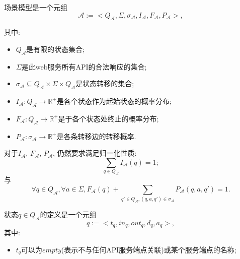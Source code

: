         \begin{definition}
            \label{def:our}
            场景模型是一个元组
            \begin{equation}
                \label{eq:scenario_model}
                 \mathcal{A} := <Q_{\mathcal{A}}, \Sigma, \sigma_{\mathcal{A}}, I_{\mathcal{A}}, F_{\mathcal{A}}, P_{\mathcal{A}}>,
            \end{equation}
            
            其中:
            \begin{itemize}
                \item $Q_{\mathcal{A}}$是有限的状态集合;
                
                \item $\Sigma$是此web服务所有API的合法响应的集合;
                
                \item $\sigma_{\mathcal{A}} \subseteq Q_{\mathcal{A}} \times \Sigma \times Q_{\mathcal{A}}$是状态转移的集合;
                
                \item $I_{\mathcal{A}} : Q_{\mathcal{A}} \to \mathbb{R}^{+}$是各个状态作为起始状态的概率分布;
                
                \item $F_{\mathcal{A}} : Q_{\mathcal{A}} \to \mathbb{R}^{+}$是于各个状态处终止的概率分布;
                
                \item $P_{\mathcal{A}}: \sigma_{\mathcal{A}} \to \mathbb{R}^{+}$是各条转移边的转移概率.
            \end{itemize}
            
            对于$I_{\mathcal{A}}$, $F_{\mathcal{A}}$, $P_{\mathcal{A}}$, 仍然要求满足归一化性质:
            \begin{equation}
                \label{eq:model_normal1}
                \sum_{q \in Q_{\mathcal{A}}} I_{\mathcal{A}}(q) = 1;
            \end{equation}
            与
            \begin{equation}
                \label{eq:model_normal2}
                \forall q \in Q_{\mathcal{A}}, \forall a \in \Sigma, F_{\mathcal{A}}(q) + \sum_{q' \in Q_{\mathcal{A}}, (q,a,q') \in \sigma_{\mathcal{A}}} P_{\mathcal{A}}(q,a,q') = 1.
            \end{equation}
            
            状态$q \in Q_{\mathcal{A}}$的定义是一个元组
            \begin{equation}
                \label{eq:scenario_model_state}
                q := <t_q, in_q, out_q, d_q, a_q>,
            \end{equation}
            其中:
            \begin{itemize}
                \item $t_q$可以为$empty$(表示不与任何API服务端点关联)或某个服务端点的名称;
                

\end{itemize}
\end{definition}
